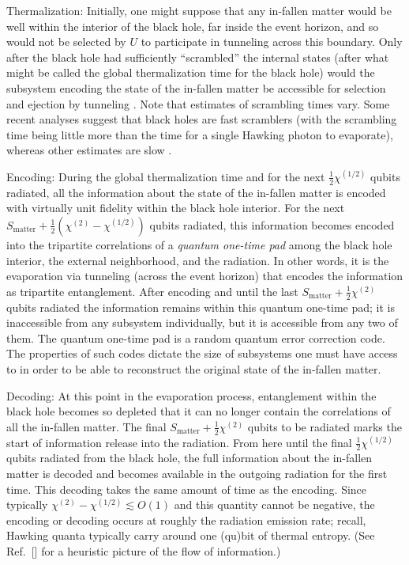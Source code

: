 \documentclass[aps,showpacs,prl,12pt]{revtex4}
\begin{document}
Thermalization: Initially, one might suppose that any 
in-fallen matter would be well
within the interior of the black hole, far inside the event horizon,
and so would not be selected by $U$ to participate in tunneling across
this boundary. Only after the black hole had sufficiently ``scrambled''
the internal states (after what might be called the global thermalization
time \cite{Hayden07} for the black hole) would the subsystem encoding
the state of the in-fallen matter be accessible for selection and
ejection by tunneling \cite{fnB}. Note that estimates of scrambling
times vary. Some recent analyses suggest that black holes are fast 
scramblers \cite{Hayden07,Sekino08} (with the scrambling time being little 
more than the time for a single Hawking photon to evaporate), whereas 
other estimates are slow \cite{Giddings07}. 

Encoding: During the global thermalization time and for the next
$\frac{1}{2}\chi^{(1/2)}$ qubits radiated, all the information
about the state of the in-fallen matter is encoded with virtually
unit fidelity within the black hole interior. For the next
$S_{\text{matter}}+\frac{1}{2}(\chi^{(2)}-\chi^{(1/2)})$ qubits
radiated, this information becomes encoded into the tripartite
correlations of a {\it quantum one-time pad} \cite{me} among the black
hole interior, the external neighborhood, and the radiation. In other
words, it is the evaporation via tunneling (across the event horizon)
that encodes the information as tripartite entanglement. After encoding
and until the last $S_{\text{matter}}+\frac{1}{2} \chi^{(2)}$
qubits radiated the information remains within this quantum one-time pad;
it is inaccessible from any subsystem individually, but it is
accessible from any two of them. The quantum one-time pad is a random
quantum error correction code. The properties of such codes dictate the
size of subsystems one must have access to in order to be able to
reconstruct the original state of the in-fallen matter.

Decoding:
At this point in the evaporation process, entanglement within the 
black hole becomes so depleted that it can no longer contain the 
correlations of all the in-fallen matter. The final
$S_{\text{matter}}+\frac{1}{2} \chi^{(2)}$ qubits to be radiated marks
the start of information release into the radiation. From here until
the final $\frac{1}{2}\chi^{(1/2)}$ qubits radiated from the black hole, 
the full information about the in-fallen matter is decoded and becomes
available in the outgoing radiation for the first time. This decoding
takes the same amount of time as the encoding. Since typically
$\chi^{(2)}-\chi^{(1/2)} \lesssim O(1)$ and this 
quantity cannot be negative, the encoding or decoding occurs at roughly the 
radiation emission rate; recall, Hawking quanta typically carry around
one (qu)bit of thermal entropy. (See Ref.~[] for a
heuristic picture of the flow of information.) 
\end{document}
